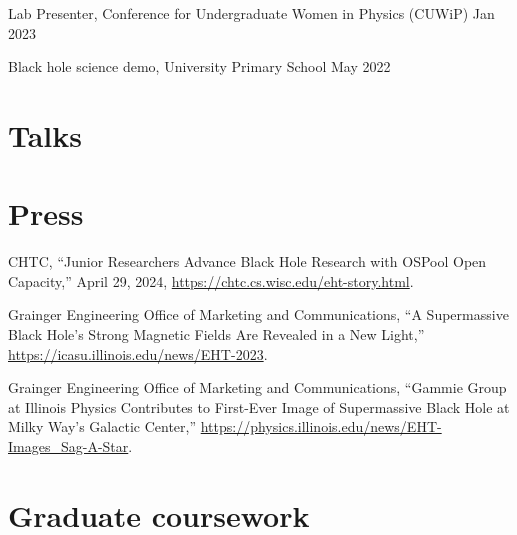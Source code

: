 \documentclass[11pt]{article}
\begin{document}
Lab Presenter, Conference for Undergraduate Women in Physics (CUWiP) \hfill Jan 2023\\

Black hole science demo, University Primary School \hfill May 2022\\


\ifdefined\withtalks{}
\section*{Talks}

\else\fi

\ifdefined\withpress{}
\section*{Press}
CHTC, “Junior Researchers Advance Black Hole Research with OSPool Open Capacity,” April 29, 2024, \href{https://chtc.cs.wisc.edu/eht-story.html}{https://chtc.cs.wisc.edu/eht-story.html}.

Grainger Engineering Office of Marketing and Communications, “A Supermassive Black Hole’s Strong Magnetic Fields Are Revealed in a New Light,” \href{https://icasu.illinois.edu/news/EHT-2023}{https://icasu.illinois.edu/news/EHT-2023}.

Grainger Engineering Office of Marketing and Communications, “Gammie Group at Illinois Physics Contributes to First-Ever Image of Supermassive Black Hole at Milky Way’s Galactic Center,” \href{https://physics.illinois.edu/news/EHT-Images\_Sag-A-Star}{https://physics.illinois.edu/news/EHT-Images\_Sag-A-Star}.

\else\fi

\ifdefined\withcourses{}
\section*{Graduate coursework}

\else\fi
\end{document}
